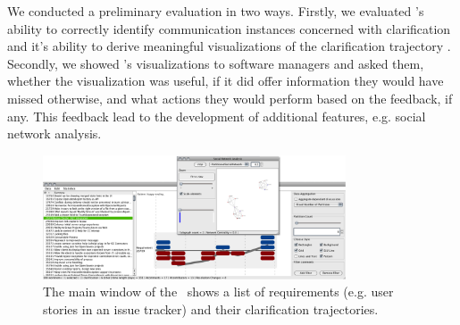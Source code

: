 We conducted a preliminary evaluation in two ways. Firstly, we evaluated \viss's ability to correctly identify communication instances concerned with clarification and it's ability to derive meaningful visualizations of the clarification trajectory \cite{Knauss2012f}. 
Secondly, we showed  \viss's visualizations to software managers and asked them, whether the visualization was useful, if it did offer information they would have missed otherwise, and what actions they would perform based on the feedback, if any. 
This feedback lead to the development of additional features, e.g. social network analysis.

\begin{figure}
\centering
\includegraphics[width=0.8\textwidth]{img/vissuelizer-screenshot}
\caption{The main window of the \viss\ shows a list of requirements (e.g. user stories in an issue tracker) and their clarification trajectories.}
\label{fig:screenshot}
\end{figure}